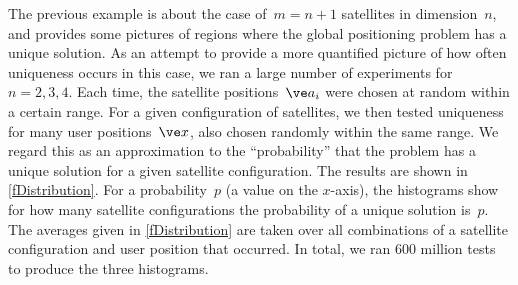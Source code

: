 \documentclass[reqno]{amsart}
\begin{document}
\begin{ex} \label{exDistribution}%
  The previous example is about the case of~$m = n+1$ satellites in dimension~$n$, and provides some pictures of regions where the global positioning problem has a unique solution. As an attempt to provide a more quantified picture of how often uniqueness occurs in this case, we ran a large number of experiments for $n = 2,3,4$. Each time, the satellite positions~$\ve a_i$ were chosen at random within a certain range. For a given configuration of satellites, we then tested uniqueness for many user positions~$\ve x$, also chosen randomly within the same range. We regard this as an approximation to the ``probability'' that the problem has a unique solution for a given satellite configuration. The results are shown in \cref{fDistribution}. For a probability~$p$ (a value on the $x$-axis), the histograms show for how many satellite configurations the probability of a unique solution is~$p$. The averages given in \cref{fDistribution} are taken over all combinations of a satellite configuration and user position that occurred. In total, we ran 600 million tests to produce the three histograms.
  

\end{ex}
\end{document}
